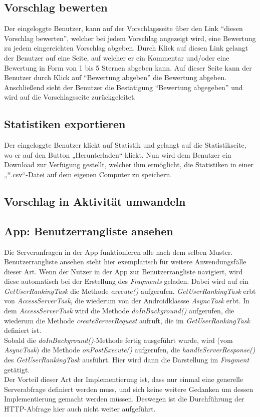 \subsection{Vorschlag bewerten}
Der eingeloggte Benutzer, kann auf der Vorschlagsseite über den Link
``diesen Vorschlag bewerten'', welcher bei jedem Vorschlag angezeigt
wird, eine Bewertung zu jedem eingereichten Vorschlag abgeben. Durch
Klick auf diesen Link gelangt der Benutzer auf eine Seite, auf welcher
er ein Kommentar und/oder eine Bewertung in Form von 1 bis 5 Sternen
abgeben kann.  Auf dieser Seite kann der Benutzer durch Klick auf
 ``Bewertung abgeben'' die Bewertung abgeben. Anschließend sieht
 der Benutzer die Bestätigung ``Bewertung abgegeben'' und wird auf die Vorschlagsseite zurückgeleitet.\\
 

\subsection{Statistiken exportieren}
Der eingeloggte Benutzer klickt auf Statistik und gelangt auf die Statistikseite, wo er auf den Button „Herunterladen“ klickt. Nun wird dem Benutzer ein Download zur Verfügung gestellt, welcher ihm ermöglicht, die Statistiken in einer „*.csv“-Datei auf dem eigenen Computer zu speichern.\\
\subsection{Vorschlag in Aktivität umwandeln}
\subsection{App: Benutzerrangliste ansehen}
Die Serveranfragen in der App funktionieren alle nach dem selben Muster. Benutzerrangliste ansehen steht hier exemplarisch für weitere Anwendungsfälle dieser Art.
Wenn der Nutzer in der App zur Benutzerrangliste navigiert, wird diese automatisch bei der Erstellung des \emph{Fragments} geladen. Dabei wird auf ein \emph{GetUserRankingTask} die Methode \emph{execute()} aufgerufen. \emph{GetUserRankingTask} erbt von \emph{AccessServerTask}, die wiederum von der Androidklassse \emph{AsyncTask} erbt. In dem \emph{AccessServerTask} wird die Methode \emph{doInBackground()} aufgerufen, die wiederum die Methode \emph{createServerRequest} aufruft, die im \emph{GetUserRankingTask} definiert ist.\\
Sobald die \emph{doInBackground()}-Methode fertig ausgeführt wurde, wird (vom \emph{AsyncTask}) die Methode \emph{onPostExecute()} aufgerufen, die \emph{handleServerResponse()} des \emph{GetUserRankingTask} ausführt. Hier wird dann die Darstellung im \emph{Fragment} getätigt.\\
Der Vorteil dieser Art der Implementierung ist, dass nur einmal eine generelle Serverabfrage definiert werden muss, und sich keine weitere Gedanken um dessen Implementierung gemacht werden m\"ussen. Deswegen ist die Durchführung der HTTP-Abfrage hier auch nicht weiter aufgeführt.